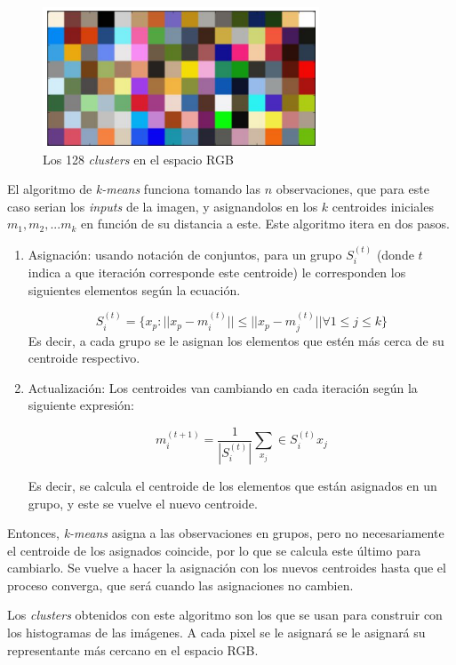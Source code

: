 \documentclass[14pt,a4paper]{report}
\begin{document}
\begin{figure}[h]
  \centering
\includegraphics[scale=0.7]{../clusters-kmeans.png} 
  \caption{Los 128 \textit{clusters} en el espacio RGB}
  \label{fig:neural-network}
\end{figure}

El algoritmo de \textit{k-means} funciona tomando las $n$ observaciones, que para este caso serian los \textit{inputs} de la imagen, y asignandolos en los $k$ centroides iniciales $m_1, m_2, ... m_k$ en función de su distancia a este. Este algoritmo itera en dos pasos.
\begin{enumerate}
\item Asignación: usando notación de conjuntos, para un grupo $S^{(t)}_{i}$ (donde $t$ indica a que iteración corresponde este centroide) le corresponden los siguientes elementos según la ecuación.

$$
S^{(t)}_{i} = \{x_p:||x_p-m^{(t)}_{i}||\leq||x_p-m^{(t)}_{j}||\forall 1\leq j \leq k\}
$$
Es decir, a cada grupo se le asignan los elementos que estén más cerca de su centroide respectivo.
\item Actualización: Los centroides van cambiando en cada iteración según la siguiente expresión:

$$
m^{(t+1)}_{i} = \frac{1}{|S^{(t)}_{i}|}\sum_{x_{j}}\in S^{(t)}_{i}x_{j}
$$

Es decir, se calcula el centroide de los elementos que están asignados en un grupo, y este se vuelve el nuevo centroide.

\end{enumerate} 

Entonces, \textit{k-means} asigna a las observaciones en grupos, pero no necesariamente el centroide de los asignados coincide, por lo que se calcula este último para cambiarlo. Se vuelve a hacer la asignación con los nuevos centroides hasta que el proceso converga, que será cuando las asignaciones no cambien.

Los \textit{clusters} obtenidos con este algoritmo son los que se usan para construir con los histogramas de las imágenes. A cada pixel se le asignará se le asignará su representante más cercano en el espacio RGB.
\end{document}
